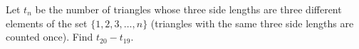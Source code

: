 Let $t_n$ be the number of triangles whose three side lengths are three different elements of the set $\{1,2,3,\dots,n\}$ (triangles with the same three side lengths are counted once). Find $t_{20}-t_{19}$.
